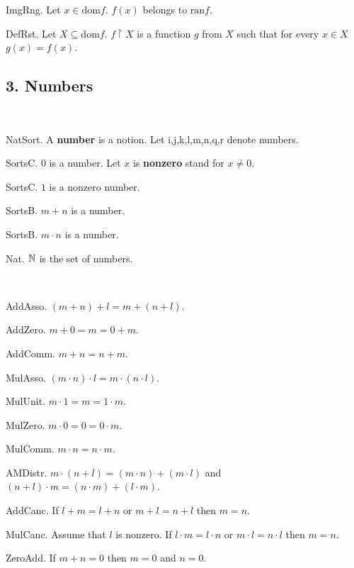 \begin{lemma} ImgRng.
Let $x \in \text{dom} f$. $f(x)$ belongs to $\text{ran} f$.
\end{lemma}

\begin{definition} DefRst.
Let $X \subseteq \text{dom} f$. 
$f \upharpoonright X$ is a function $g$ from $X$
such that for every $x \in X$ $g(x) = f(x)$.
\end{definition}

\subsection{3. Numbers}


\begin{signatures}\\
\begin{enumerate}

\signatureitem NatSort.
A {\bf number} is a notion.
Let i,j,k,l,m,n,q,r denote numbers.

\signatureitem SortsC.  
$0$ is a number.
Let $x$ is {\bf nonzero} stand for $x \neq 0$.

\signatureitem SortsC.
$1$ is a nonzero number.

\signatureitem SortsB.
$m + n$ is a number.

\signatureitem SortsB.
$m \cdot n$ is a number.
\end{enumerate}
\end{signatures}

\begin{definition} Nat.
${\Bbb N}$ is the set of numbers.
\end{definition}

\begin{axioms}\\
\begin{enumerate}

\axiomitem AddAsso. $(m + n) + l = m + (n + l)$.

\axiomitem AddZero.  $m + 0 = m = 0 + m$.

\axiomitem AddComm.   $m + n = n + m$.

\axiomitem MulAsso.  
$(m \cdot n) \cdot l = m \cdot (n \cdot l)$.

\axiomitem MulUnit.  $m \cdot 1 = m = 1 \cdot m$.

\axiomitem MulZero.  $m \cdot 0 = 0 = 0 \cdot m$.

\axiomitem MulComm.  $m \cdot n = n \cdot m$.

\axiomitem AMDistr.  
$m \cdot (n + l) = (m \cdot n) + (m \cdot l)$ and
$(n + l) \cdot m = (n \cdot m) + (l \cdot m)$.

\axiomitem AddCanc.  
If $l + m = l + n$ or $m + l = n + l$ then $m = n$.

\axiomitem MulCanc.
Assume that $l$ is nonzero. If 
$l \cdot m = l \cdot n$ or $m \cdot l = n \cdot l$ 
then $m = n$.

\axiomitem ZeroAdd.
If $m + n = 0$ then $m = 0$ and $n = 0$.
\end{enumerate}
\end{axioms}

